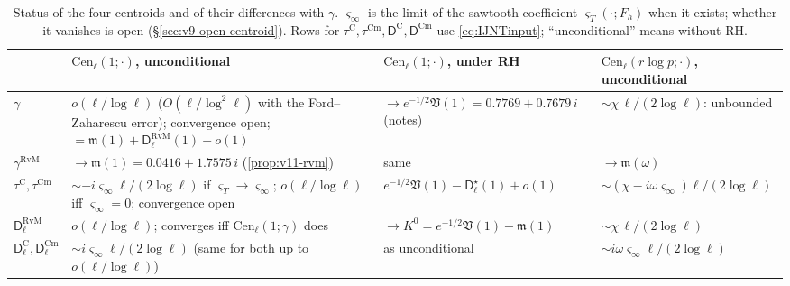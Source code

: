 \documentclass[11pt,a4paper]{article}
\numberwithin{equation}{section}
\theoremstyle{definition}
\theoremstyle{remark}
\newcommand{\Cm}{\mathrm{Cm}}
\begin{document}
\begin{table}[ht]
\centering\small
\renewcommand{\arraystretch}{1.2}
\begin{tabular}{@{}p{}p{}p{}p{}@{}}
\toprule
 & $\mathrm{Cen}_\ell(1;\cdot)$, unconditional & $\mathrm{Cen}_\ell(1;\cdot)$, under RH & $\mathrm{Cen}_\ell(r\log p;\cdot)$, unconditional\\
\midrule
$\gamma$ & $o(\ell/\log\ell)$ ($O(\ell/\log^2\ell)$ with the Ford--Zaharescu error); convergence open; $=\mathfrak m(1)+\mathsf D^{\mathrm{RvM}}_\ell(1)+o(1)$ & $\to e^{-1/2}\mathfrak V(1)=0.7769+0.7679\,i$ (notes) & $\sim\chi\,\ell/(2\log\ell)$: unbounded\\
$\gamma^{\mathrm{RvM}}$ & $\to\mathfrak m(1)=0.0416+1.7575\,i$ (\cref{prop:v11-rvm}) & same & $\to\mathfrak m(\omega)$\\
$\tau^{\mathrm C},\tau^{\Cm}$ & $\sim-i\varsigma_\infty\ell/(2\log\ell)$ if $\varsigma_T\to\varsigma_\infty$; $o(\ell/\log\ell)$ iff $\varsigma_\infty=0$; convergence open & $e^{-1/2}\mathfrak V(1)-\mathsf D^\star_\ell(1)+o(1)$ & $\sim(\chi-i\omega\varsigma_\infty)\ell/(2\log\ell)$\\
\midrule
$\mathsf D^{\mathrm{RvM}}_\ell$ & $o(\ell/\log\ell)$; converges iff $\mathrm{Cen}_\ell(1;\gamma)$ does & $\to K^0=e^{-1/2}\mathfrak V(1)-\mathfrak m(1)$ & $\sim\chi\,\ell/(2\log\ell)$\\
$\mathsf D^{\mathrm C}_\ell,\mathsf D^{\Cm}_\ell$ & $\sim i\varsigma_\infty\ell/(2\log\ell)$ (same for both up to $o(\ell/\log\ell)$) & as unconditional & $\sim i\omega\varsigma_\infty\ell/(2\log\ell)$\\
\bottomrule
\end{tabular}
\caption{Status of the four centroids and of their differences with $\gamma$. $\varsigma_\infty$ is the limit of the sawtooth coefficient $\varsigma_T(\cdot;F_h)$ when it exists; whether it vanishes is open (\S\ref{sec:v9-open-centroid}). Rows for $\tau^{\mathrm C},\tau^{\Cm},\mathsf D^{\mathrm C},\mathsf D^{\Cm}$ use \eqref{eq:IJNTinput}; ``unconditional'' means without RH.}
\label{tab:v11-centroids}
\end{table}
\end{document}
